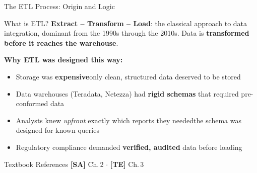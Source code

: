 \documentclass[aspectratio=169,10pt]{beamer}
\begin{document}
\begin{frame}{The ETL Process: Origin and Logic}
 
      \begin{block}{What is ETL?}
        \textbf{Extract -- Transform -- Load}: the classical approach to data integration, dominant from the 1990s through the 2010s.  Data is \textbf{transformed before it reaches the warehouse}.
      \end{block}
      \vspace{6pt}
      \textbf{Why ETL was designed this way:}
      \begin{itemize}
        \item Storage was \textbf{expensive}\textemdash only clean, structured data deserved to be stored
        \item Data warehouses (Teradata, Netezza) had \textbf{rigid schemas} that required pre-conformed data
        \item Analysts knew \emph{upfront} exactly which reports they needed\textemdash the schema was designed for known queries
        \item Regulatory compliance demanded \textbf{verified, audited} data before loading
      \end{itemize}
      \vspace{4pt}
      \begin{exampleblock}{Textbook References}
        \textbf{[SA]} Ch.\,2 $\cdot$ \textbf{[TE]} Ch.\,3
      \end{exampleblock}

     
\end{frame}
\end{document}
